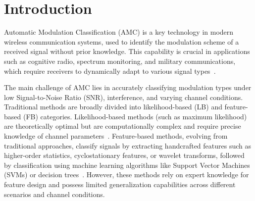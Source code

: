 \documentclass[conference]{IEEEtran}
\begin{document}




\section{Introduction}
Automatic Modulation Classification (AMC) is a key technology in modern wireless communication systems, used to identify the modulation scheme of a received signal without prior knowledge. This capability is crucial in applications such as cognitive radio, spectrum monitoring, and military communications, which require receivers to dynamically adapt to various signal types~\cite{dobre2007survey}.

The main challenge of AMC lies in accurately classifying modulation types under low Signal-to-Noise Ratio (SNR), interference, and varying channel conditions. Traditional methods are broadly divided into likelihood-based (LB) and feature-based (FB) categories. Likelihood-based methods (such as maximum likelihood) are theoretically optimal but are computationally complex and require precise knowledge of channel parameters~\cite{hameed2009likelihood}. Feature-based methods, evolving from traditional approaches, classify signals by extracting handcrafted features such as higher-order statistics, cyclostationary features, or wavelet transforms, followed by classification using machine learning algorithms like Support Vector Machines (SVMs) or decision trees~\cite{hazza2013overview}. However, these methods rely on expert knowledge for feature design and possess limited generalization capabilities across different scenarios and channel conditions.
\end{document}

